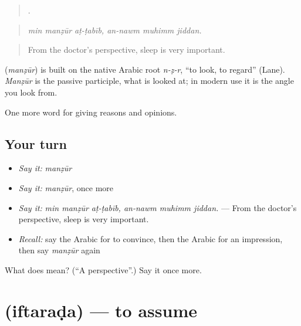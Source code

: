 \begin{quote}
     .
\end{quote}

\begin{quote}
\emph{min manẓūr aṭ-ṭabīb, an-nawm muhimm jiddan.}
\end{quote}

\begin{quote}
From the doctor's perspective, sleep is very important.
\end{quote}

\begin{cousinweb}
\textbf{} (\emph{manẓūr}) is built on the native Arabic root \emph{n-ẓ-r}, \textquotedblleft{}to look, to regard\textquotedblright{} (Lane). \emph{Manẓūr} is the passive participle, what is looked at; in modern use it is the angle you look from.
\end{cousinweb}

\begin{grammarlens}[title={What you've built}]
One more word for giving reasons and opinions.
\end{grammarlens}

\subsection*{Your turn}
\begin{itemize}
\raggedright
  \item \emph{Say it:} \emph{manẓūr}
  \item \emph{Say it:} \emph{manẓūr}, once more
  \item \emph{Say it:} \emph{min manẓūr aṭ-ṭabīb, an-nawm muhimm jiddan.} — From the doctor's perspective, sleep is very important.
  \item \emph{Recall:} say the Arabic for to convince, then the Arabic for an impression, then say \emph{manẓūr} again
\end{itemize}

\begin{tcolorbox}[breakable,colback=teal!4,colframe=teal!35!black,title={Before you move on}]
What does  mean? (\textquotedblleft{}A perspective\textquotedblright{}.) Say it once more.
\end{tcolorbox}
\section[\texorpdfstring{\ar{افترض} (iftaraḍa)}{افترض (iftaraḍa)}]{ (iftaraḍa) — to assume}

